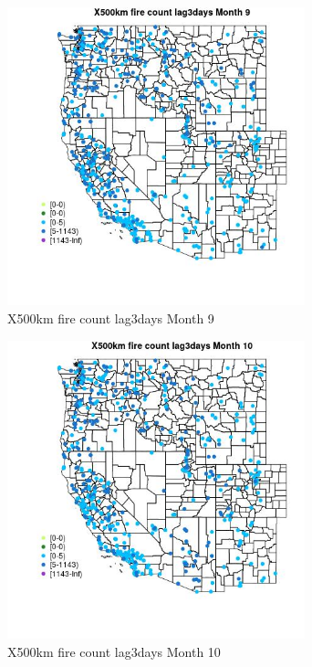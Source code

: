 \begin{figure} 
\centering  
\includegraphics[width=0.77\textwidth]{Code_Outputs/Report_ML_input_PM25_Step4_part_e_de_duplicated_aves_compiled_2019-05-14wNAs_MapObsMo9X500km_fire_count_lag3days.jpg} 
\caption{\label{fig:Report_ML_input_PM25_Step4_part_e_de_duplicated_aves_compiled_2019-05-14wNAsMapObsMo9X500km_fire_count_lag3days}X500km fire count lag3days Month 9} 
\end{figure} 
 

\begin{figure} 
\centering  
\includegraphics[width=0.77\textwidth]{Code_Outputs/Report_ML_input_PM25_Step4_part_e_de_duplicated_aves_compiled_2019-05-14wNAs_MapObsMo10X500km_fire_count_lag3days.jpg} 
\caption{\label{fig:Report_ML_input_PM25_Step4_part_e_de_duplicated_aves_compiled_2019-05-14wNAsMapObsMo10X500km_fire_count_lag3days}X500km fire count lag3days Month 10} 
\end{figure} 
 

